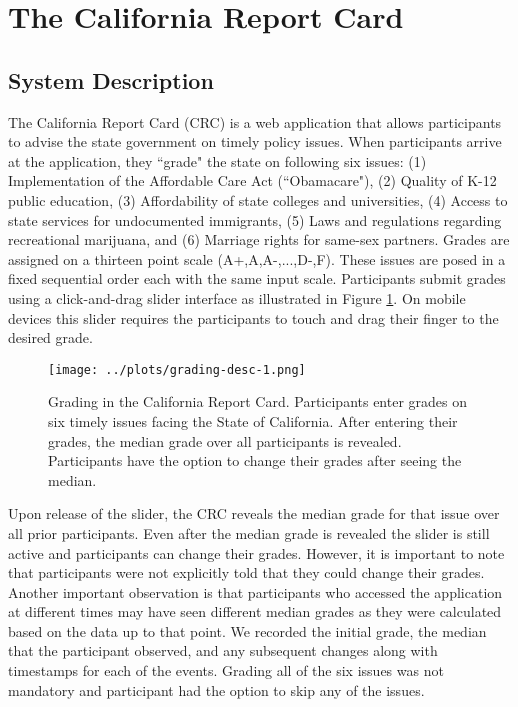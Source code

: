 \section{The California Report Card}
\subsection{System Description}
The California Report Card (CRC) is a web application that allows participants to advise the state government on timely policy issues.
When participants arrive at the application, they ``grade" the state on following six issues: (1) Implementation of the Affordable Care Act (``Obamacare"),
(2) Quality of K-12 public education, (3) Affordability of state colleges and universities, (4) Access to state services for undocumented immigrants, (5) Laws and regulations regarding recreational marijuana, and (6) Marriage rights for same-sex partners.
Grades are assigned on a thirteen point scale (A+,A,A-,...,D-,F).
These issues are posed in a fixed sequential order each with the same input scale.
Participants submit grades using a click-and-drag slider interface as illustrated in Figure \ref{grading-1}.
On mobile devices this slider requires the participants to touch and drag their finger to the desired grade.

\begin{figure}[h]
  \centering
    \texttt{[image: ../plots/grading-desc-1.png]}
      \caption{Grading in the California Report Card. Participants enter grades on six timely issues facing the State of California. After entering their grades, the median grade over all participants is revealed. Participants have the option to change their grades after seeing the median.}
      \label{grading-1}
\end{figure}

Upon release of the slider, the CRC reveals the median grade for that issue over all prior participants.
Even after the median grade is revealed the slider is still active and participants can change their grades.
However, it is important to note that participants were not explicitly told that they could change their grades.
Another important observation is that participants who accessed the application at different times may have seen different median grades as they were calculated based on the data up to that point.
We recorded the initial grade, the median that the participant observed, and any subsequent changes along with timestamps for each of the events. 
Grading all of the six issues was not mandatory and participant had the option to skip any of the issues.

